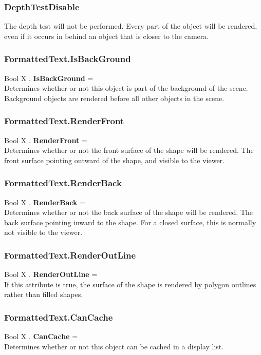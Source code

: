 \subsubsection{DepthTestDisable \label{T:DepthTest|DepthTestDisable}}
The depth test will not be performed. Every part of the object will be rendered, even if it occurs in behind an object that is closer to the camera.

\subsubsection{FormattedText.IsBackGround \label{F:FormattedText:IsBackGround}}
Bool X . \textbf{IsBackGround} = \\
Determines whether or not this object is part of the background of the scene. Background objects are rendered before all other objects in the scene.

\subsubsection{FormattedText.RenderFront \label{F:FormattedText:RenderFront}}
Bool X . \textbf{RenderFront} = \\
Determines whether or not the front surface of the shape will be rendered. The front surface pointing outward of the shape, and visible to the viewer.

\subsubsection{FormattedText.RenderBack \label{F:FormattedText:RenderBack}}
Bool X . \textbf{RenderBack} = \\
Determines whether or not the back surface of the shape will be rendered. The back surface pointing inward to the shape. For a closed surface, this is normally not visible to the viewer.

\subsubsection{FormattedText.RenderOutLine \label{F:FormattedText:RenderOutLine}}
Bool X . \textbf{RenderOutLine} = \\
If this attribute is true, the surface of the shape is rendered by polygon outlines rather than filled shapes.

\subsubsection{FormattedText.CanCache \label{F:FormattedText:CanCache}}
Bool X . \textbf{CanCache} = \\
Determines whether or not this object can be cached in a display list.


